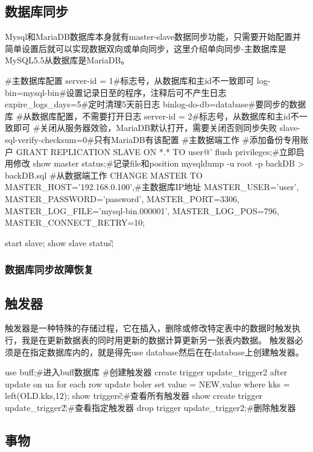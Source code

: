 \subsection{数据库同步}
Mysql和MariaDB数据库本身就有master-slave数据同步功能，只需要开始配置并简单设置后就可以实现数据双向或单向同步，这里介绍单向同步-主数据库是MySQL5.5从数据库是MariaDB。
\begin{shell}
#主数据库配置
server-id = 1#标志号，从数据库和主id不一致即可
log-bin=mysql-bin#设置记录日至的程序，注释后可不产生日志
expire_logs_days=5#定时清理5天前日志
binlog-do-db=database#要同步的数据库
#从数据库配置，不需要打开日志
server-id = 2#标志号，从数据库和主id不一致即可
#关闭从服务器效验，MariaDB默认打开，需要关闭否则同步失败
slave-sql-verify-checksum=0#只有MariaDB有该配置
#主数据端工作
#添加备份专用账户
GRANT REPLICATION SLAVE ON *.* TO user@'%
flush privileges;#立即启用修改
show master status;#记录file和position
mysqldump -u root -p backDB > backDB.sql
#从数据端工作
CHANGE MASTER TO
MASTER_HOST='192.168.0.100',#主数据库IP地址
MASTER_USER='user',
MASTER_PASSWORD='password',
MASTER_PORT=3306,
MASTER_LOG_FILE='mysql-bin.000001',
MASTER_LOG_POS=796,
MASTER_CONNECT_RETRY=10;

start slave;
show slave status\G;

\end{shell}
\subsubsection{数据库同步故障恢复}

\subsection{触发器}
触发器是一种特殊的存储过程，它在插入，删除或修改特定表中的数据时触发执行，我是在更新数据表的同时用更新的数据计算更新另一张表内数据。
触发器必须是在指定数据库内的，就是得先use database然后在在database上创建触发器。
\begin{shell}
use buff;#进入buff数据库
#创建触发器
create trigger update_trigger2 after update on ua for each row update boler set value = NEW.value where kks = left(OLD.kks,12);
show triggers\G;#查看所有触发器
show create trigger update_trigger2\G;#查看指定触发器
drop trigger update_trigger2;#删除触发器
\end{shell}
\subsection{事物}

